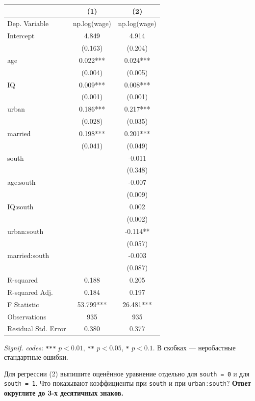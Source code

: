 \documentclass[
  russian,
]{article}
\newcounter{none} %
\begin{document}
{\def\LTcaptype{none} %
\begin{longtable}[]{@{}lcc@{}}
\toprule\noalign{}
& (1) & (2) \\
\midrule\noalign{}
\endhead
\bottomrule\noalign{}
\endlastfoot
Dep. Variable & np.log(wage) & np.log(wage) \\
Intercept & 4.849 & 4.914 \\
& (0.163) & (0.204) \\
age & 0.022*** & 0.024*** \\
& (0.004) & (0.005) \\
IQ & 0.009*** & 0.008*** \\
& (0.001) & (0.001) \\
urban & 0.186*** & 0.217*** \\
& (0.028) & (0.035) \\
married & 0.198*** & 0.201*** \\
& (0.041) & (0.049) \\
south & & -0.011 \\
& & (0.348) \\
age:south & & -0.007 \\
& & (0.009) \\
IQ:south & & 0.002 \\
& & (0.002) \\
urban:south & & -0.114** \\
& & (0.057) \\
married:south & & -0.003 \\
& & (0.087) \\
R-squared & 0.188 & 0.205 \\
R-squared Adj. & 0.184 & 0.197 \\
F Statistic & 53.799*** & 26.481*** \\
Observations & 935 & 935 \\
Residual Std. Error & 0.380 & 0.377 \\
\end{longtable}
}

\emph{Signif. codes:} \texttt{***} \(p<0.01\), \texttt{**} \(p<0.05\),
\texttt{*} \(p<0.1\). В скобках --- неробастные стандартные ошибки.

Для регрессии (2) выпишите оценённое уравнение отдельно для
\texttt{south\ =\ 0} и для \texttt{south\ =\ 1}. Что показывают
коэффициенты при \texttt{south} и при \texttt{urban:south}?
\textbf{Ответ округлите до 3-х десятичных знаков.}
\end{document}

